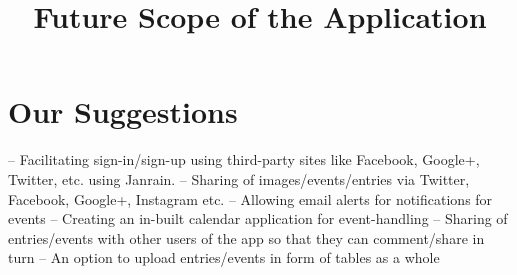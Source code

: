 \documentclass[11pt]{article}
\title{\textbf{Future Scope of the Application}}
\author{}
\date{}
\begin{document}
\maketitle

\section{Our Suggestions}

-- Facilitating sign-in/sign-up using third-party sites like Facebook, Google+, Twitter, etc. using Janrain.
\newline
-- Sharing of images/events/entries via Twitter, Facebook, Google+, Instagram etc.
\newline
-- Allowing email alerts for notifications for events 
\newline
-- Creating an in-built calendar application for event-handling
\newline
-- Sharing of entries/events with other users of the app so that they can comment/share in turn
\newline
-- An option to upload entries/events in form of tables as a whole 
\end{document}
